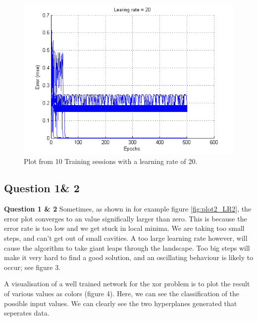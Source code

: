 \documentclass[a4paper]{article}
\begin{document}
\begin{figure}[h!] %
	\caption{\label{fig:plot2_LR20}Plot from 10 Training sessions with a learning rate of 20.}
	\includegraphics[]{plot2_LR20.png}
\end{figure}
\subsection*{Question 1\& 2}
\textbf{Question 1 \& 2} Sometimes, as shown in for example figure \ref{fig:plot2_LR2}, 
the error plot converges to an value significally larger than zero.
This is because the error rate is too low and we get stuck in local minima. We are 
taking too small steps, and can't get out of small cavities. A too large learning 
rate however, will cause the algorithm to take giant leaps through the landscape. 
Too big steps will make it very hard to find a good solution, and an oscillating 
behaviour is likely to occur; see figure 3. 

A visualisation of a well trained network for the xor problem  
is to plot the result of various values 
as colors (figure 4). 
Here, we can see the classification of the possible input values. We can 
clearly see the two hyperplanes generated that seperates data. 
\end{document}
